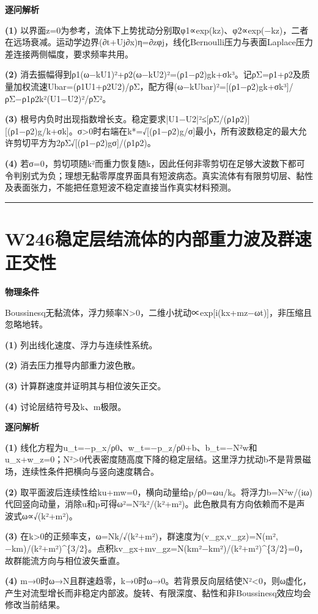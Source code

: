 \documentclass[UTF8,a4paper,11pt,oneside,openany]{ctexbook}
\begin{document}
\par\medskip\noindent\textbf{逐问解析}
\par\noindent\textbf{(1)} 以界面z=0为参考，流体下上势扰动分别取φ1∝exp(kz)、φ2∝exp(−kz)，二者在远场衰减。运动学边界(∂t+Uj∂x)η=∂zφj，线化Bernoulli压力与表面Laplace压力差连接两侧幅度，要求频率共用。
\par\noindent\textbf{(2)} 消去振幅得到ρ1(ω−kU1)²+ρ2(ω−kU2)²=(ρ1−ρ2)gk+σk³。记ρΣ=ρ1+ρ2及质量加权流速Ubar=(ρ1U1+ρ2U2)/ρΣ，配方得(ω−kUbar)²=[(ρ1−ρ2)gk+σk³]/ρΣ−ρ1ρ2k²(U1−U2)²/ρΣ²。
\par\noindent\textbf{(3)} 根号内负时出现指数增长支。稳定要求|U1−U2|²≤[ρΣ/(ρ1ρ2)][(ρ1−ρ2)g/k+σk]。σ>0时右端在k*=√[(ρ1−ρ2)g/σ]最小，所有波数稳定的最大允许剪切平方为2ρΣ√[(ρ1−ρ2)gσ]/(ρ1ρ2)。
\par\noindent\textbf{(4)} 若σ=0，剪切项随k²而重力恢复随k，因此任何非零剪切在足够大波数下都可令判别式为负；理想无黏零厚度界面具有短波病态。真实流体有有限剪切层、黏性及表面张力，不能把任意短波不稳定直接当作真实材料预测。

\par\bigskip\hrule\bigskip
\section*{W246\quad 稳定层结流体的内部重力波及群速正交性}
\textbf{物理条件}\par Boussinesq无黏流体，浮力频率N>0，二维小扰动∝exp[i(kx+mz−ωt)]，非压缩且忽略地转。
\par\noindent\textbf{(1)} 列出线化速度、浮力与连续性系统。
\par\noindent\textbf{(2)} 消去压力推导内部重力波色散。
\par\noindent\textbf{(3)} 计算群速度并证明其与相位波矢正交。
\par\noindent\textbf{(4)} 讨论层结符号及k、m极限。

\par\medskip\noindent\textbf{逐问解析}
\par\noindent\textbf{(1)} 线化方程为u\_t=−p\_x/ρ0、w\_t=−p\_z/ρ0+b、b\_t=−N²w和u\_x+w\_z=0；N²>0代表密度随高度下降的稳定层结。这里浮力扰动b不是背景磁场，连续性条件把横向与竖向速度耦合。
\par\noindent\textbf{(2)} 取平面波后连续性给ku+mw=0，横向动量给p/ρ0=ωu/k。将浮力b=N²w/(iω)代回竖向动量，消除u和p可得ω²=N²k²/(k²+m²)。此色散具有方向依赖而不是声波式ω∝√(k²+m²)。
\par\noindent\textbf{(3)} 在k>0的正频率支，ω=Nk/√(k²+m²)，群速度为(v\_gx,v\_gz)=N(m²,−km)/(k²+m²)\textasciicircum{}\{3/2\}。点积kv\_gx+mv\_gz=N(km²−km²)/(k²+m²)\textasciicircum{}\{3/2\}=0，故群能流方向与相位波矢垂直。
\par\noindent\textbf{(4)} m→0时ω→N且群速趋零，k→0时ω→0。若背景反向层结使N²<0，则ω虚化，产生对流型增长而非稳定内部波。旋转、有限深度、黏性和非Boussinesq效应均会修改当前结果。
\end{document}
